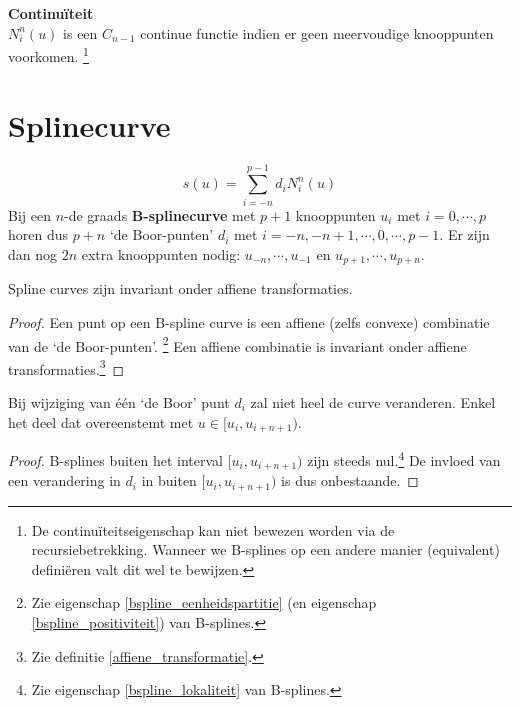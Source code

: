 \documentclass[computergesteund_ontwerp_van_curven_en_oppervlakken.tex]{subfiles}
\begin{document}
\begin{ei}
\textbf{Continu\"iteit}\\
$N_{i}^{n}(u)$ is een $C_{n-1}$ continue functie indien er geen meervoudige knooppunten voorkomen. \footnote{De continu\"iteitseigenschap kan niet bewezen worden via de recursiebetrekking. Wanneer we B-splines op een andere manier (equivalent) defini\"eren valt dit wel te bewijzen.}
\end{ei}

\section{Splinecurve}
\begin{de}
\[
s(u) = \sum_{i=-n}^{p-1}d_iN_{i}^{n}(u)
\]
Bij een $n$-de graads \textbf{B-splinecurve} met $p+1$ knooppunten $u_i$ met $i = 0,\cdots ,p$ horen dus $p+n$ `de Boor-punten' $d_i$ met $i = -n, -n+1, \cdots, 0, \cdots , p-1$. Er zijn dan nog $2n$ extra knooppunten nodig: $u_{-n},\cdots,u_{-1}$ en $u_{p+1},\cdots,u_{p+n}$.
\end{de}


\begin{ei}
\label{spline_affien_invariant}
Spline curves zijn invariant onder affiene transformaties.
\begin{proof}
Een punt op een B-spline curve is een affiene (zelfs convexe) combinatie van de `de Boor-punten'. \footnote{Zie eigenschap \ref{bspline_eenheidspartitie} (en eigenschap \ref{bspline_positiviteit}) van B-splines.}
Een affiene combinatie is invariant onder affiene transformaties.\footnote{Zie definitie \ref{affiene_transformatie}.}
\end{proof}
\end{ei}

\begin{ei}
Bij wijziging van \'e\'en `de Boor' punt $d_i$ zal niet heel de curve veranderen. Enkel het deel dat overeenstemt met $u \in [u_i,u_{i+n+1})$.
\begin{proof}
B-splines buiten het interval $[u_i,u_{i+n+1})$ zijn steeds nul.\footnote{Zie eigenschap \ref{bspline_lokaliteit} van B-splines.}
De invloed van een verandering in $d_i$ in buiten $[u_i,u_{i+n+1})$ is dus onbestaande.
\end{proof}
\end{ei}
\end{document}
